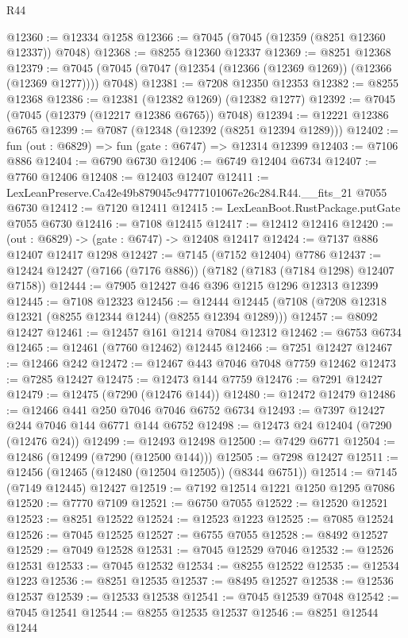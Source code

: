 \begin{lexlean}{R44}
\begin{coremodule}
{@12360 := @12334 @1258
@12366 := @7045 (@7045 (@12359 (@8251 @12360 @12337)) @7048)
@12368 := @8255 @12360 @12337
@12369 := @8251 @12368
@12379 := @7045 (@7045 (@7047 (@12354 (@12366 (@12369 @1269)) (@12366 (@12369 @1277)))) @7048)
@12381 := @7208 @12350 @12353
@12382 := @8255 @12368
@12386 := @12381 (@12382 @1269) (@12382 @1277)
@12392 := @7045 (@7045 (@12379 (@12217 @12386 @6765)) @7048)
@12394 := @12221 @12386 @6765
@12399 := @7087 (@12348 (@12392 (@8251 @12394 @1289)))
@12402 := fun (out : @6829) => fun (gate : @6747) => @12314 @12399
@12403 := @7106 @886
@12404 := @6790 @6730
@12406 := @6749 @12404 @6734
@12407 := @7760 @12406
@12408 := @12403 @12407
@12411 := LexLeanPreserve.Ca42e49b879045c94777101067e26c284.R44.__fits_21 @7055 @6730
@12412 := @7120 @12411
@12415 := LexLeanBoot.RustPackage.putGate @7055 @6730
@12416 := @7108 @12415
@12417 := @12412 @12416
@12420 := (out : @6829) -> (gate : @6747) -> @12408 @12417
@12424 := @7137 @886 @12407 @12417 @1298
@12427 := @7145 (@7152 @12404) @7786
@12437 := @12424 @12427 (@7166 (@7176 @886)) (@7182 (@7183 (@7184 @1298) @12407 @7158))
@12444 := @7905 @12427 @46 @396 @1215 @1296 @12313 @12399
@12445 := @7108 @12323
@12456 := @12444 @12445 (@7108 (@7208 @12318 @12321 (@8255 @12344 @1244) (@8255 @12394 @1289)))
@12457 := @8092 @12427
@12461 := @12457 @161 @1214 @7084 @12312
@12462 := @6753 @6734
@12465 := @12461 (@7760 @12462) @12445
@12466 := @7251 @12427
@12467 := @12466 @242
@12472 := @12467 @443 @7046 @7048 @7759 @12462
@12473 := @7285 @12427
@12475 := @12473 @144 @7759
@12476 := @7291 @12427
@12479 := @12475 (@7290 (@12476 @144))
@12480 := @12472 @12479
@12486 := @12466 @441 @250 @7046 @7046 @6752 @6734
@12493 := @7397 @12427 @244 @7046 @144 @6771 @144 @6752
@12498 := @12473 @24 @12404 (@7290 (@12476 @24))
@12499 := @12493 @12498
@12500 := @7429 @6771
@12504 := @12486 (@12499 (@7290 (@12500 @144)))
@12505 := @7298 @12427
@12511 := @12456 (@12465 (@12480 (@12504 @12505)) (@8344 @6751))
@12514 := @7145 (@7149 @12445) @12427
@12519 := @7192 @12514 @1221 @1250 @1295 @7086
@12520 := @7770 @7109
@12521 := @6750 @7055
@12522 := @12520 @12521
@12523 := @8251 @12522
@12524 := @12523 @1223
@12525 := @7085 @12524
@12526 := @7045 @12525
@12527 := @6755 @7055
@12528 := @8492 @12527
@12529 := @7049 @12528
@12531 := @7045 @12529 @7046
@12532 := @12526 @12531
@12533 := @7045 @12532
@12534 := @8255 @12522
@12535 := @12534 @1223
@12536 := @8251 @12535
@12537 := @8495 @12527
@12538 := @12536 @12537
@12539 := @12533 @12538
@12541 := @7045 @12539 @7048
@12542 := @7045 @12541
@12544 := @8255 @12535 @12537
@12546 := @8251 @12544 @1244
}
\end{coremodule}
\end{lexlean}
